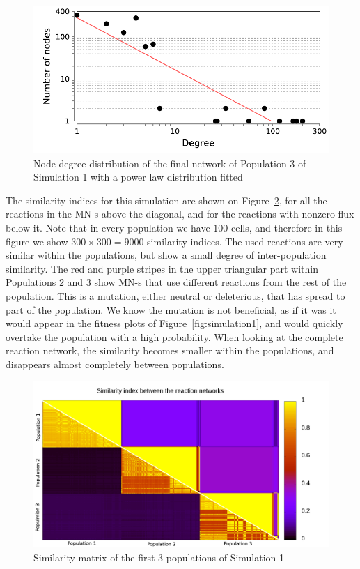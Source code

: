 \documentclass[a4paper,12pt]{article}
\begin{document}
\begin{figure}[htpb]
	\centering
	\includegraphics[width=0.8\linewidth]{nodedegreedistro.pdf}
	\caption{Node degree distribution of the final network of Population 3 of Simulation 1 with a power law distribution fitted}
	\label{fig:nodedegreedistro}
\end{figure}

The similarity indices for this simulation are shown on Figure~\ref{fig:simmatrix_firstjob}, for all the reactions in the MN-s above the diagonal, and for the reactions with nonzero flux below it. Note that in every population we have $100$ cells, and therefore in this figure we show $300 \times 300 = 9000$ similarity indices. The used reactions are very similar within the populations, but show a small degree of inter-population similarity. The red and purple stripes in the upper triangular part within Populations $2$ and $3$ show MN-s that use different reactions from the rest of the population. This is a mutation, either neutral or deleterious, that has spread to part of the population. We know the mutation is not beneficial, as if it was it would appear in the fitness plots of Figure~\ref{fig:simulation1}, and would quickly overtake the population with a high probability. When looking at the complete reaction network, the similarity becomes smaller within the populations, and disappears almost completely between populations. 

\begin{figure}[htpb]
	\centering
	\includegraphics[width=1\linewidth]{simmatrix_firstjob.png}
	\caption{Similarity matrix of the first 3 populations of Simulation 1}
	\label{fig:simmatrix_firstjob}
\end{figure}
\end{document}
